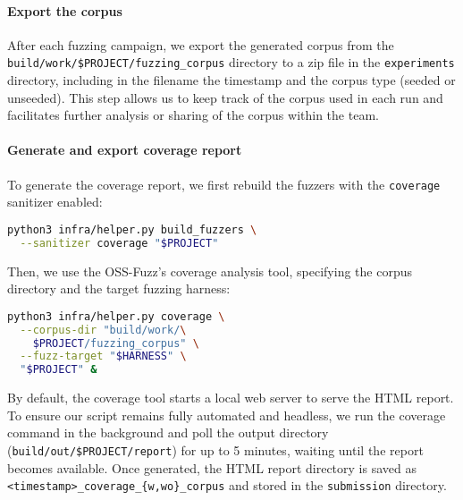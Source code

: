 \noindent \paragraph{Export the corpus}

After each fuzzing campaign, we export the generated corpus from the \texttt{build/work/\$PROJECT/fuzzing\_corpus} directory to a zip file in the \texttt{experiments} directory, including in the filename the timestamp and the corpus type (seeded or unseeded). This step allows us to keep track of the corpus used in each run and facilitates further analysis or sharing of the corpus within the team.

\noindent \paragraph{Generate and export coverage report}

To generate the coverage report, we first rebuild the fuzzers with the \texttt{coverage} sanitizer enabled:

\begin{lstlisting}[language=bash, caption=Bash command to rebuild fuzzers with coverage sanitizer using OSS-Fuzz helper script]
python3 infra/helper.py build_fuzzers \
  --sanitizer coverage "$PROJECT"
\end{lstlisting}

Then, we use the OSS-Fuzz's coverage analysis tool, specifying the corpus directory and the target fuzzing harness:

\begin{lstlisting}[language=bash, caption=Bash command to generate a coverage report after fuzzing]
python3 infra/helper.py coverage \
  --corpus-dir "build/work/\
    $PROJECT/fuzzing_corpus" \
  --fuzz-target "$HARNESS" \
  "$PROJECT" &
    \end{lstlisting}

By default, the coverage tool starts a local web server to serve the HTML report. To ensure our script remains fully automated and headless, we run the coverage command in the background and poll the output directory (\texttt{build/out/\$PROJECT/report}) for up to 5 minutes, waiting until the report becomes available. Once generated, the HTML report directory is saved as \texttt{<timestamp>\_coverage\_{\{w,wo\}\_corpus}} and stored in the \texttt{submission} directory.
